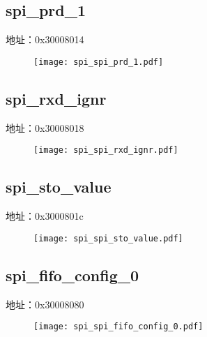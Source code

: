 \subsection{spi\_prd\_1}
\label{spi-spi-prd-1}
地址：0x30008014
 \begin{figure}[H]
\texttt{[image: spi\_spi\_prd\_1.pdf]}
\end{figure}

\subsection{spi\_rxd\_ignr}
\label{spi-spi-rxd-ignr}
地址：0x30008018
 \begin{figure}[H]
\texttt{[image: spi\_spi\_rxd\_ignr.pdf]}
\end{figure}

\subsection{spi\_sto\_value}
\label{spi-spi-sto-value}
地址：0x3000801c
 \begin{figure}[H]
\texttt{[image: spi\_spi\_sto\_value.pdf]}
\end{figure}

\subsection{spi\_fifo\_config\_0}
\label{spi-spi-fifo-config-0}
地址：0x30008080
 \begin{figure}[H]
\texttt{[image: spi\_spi\_fifo\_config\_0.pdf]}
\end{figure}

